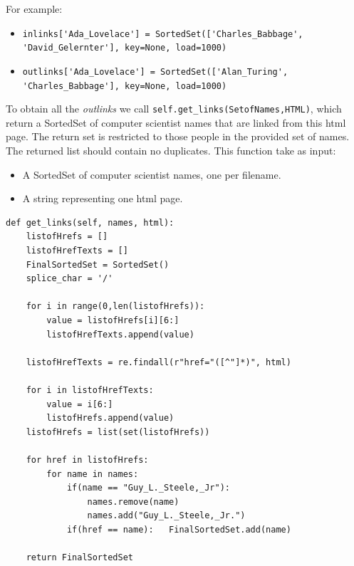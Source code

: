 \documentclass[12pt, twoside]{article}
\begin{document}
For example:
\begin{itemize}[noitemsep, topsep=0pt]
	\item \lstinline[language = iPython]{inlinks['Ada_Lovelace'] = SortedSet(['Charles_Babbage', 'David_Gelernter'], key=None, load=1000)}
	\item \lstinline[language = iPython]{outlinks['Ada_Lovelace'] = SortedSet(['Alan_Turing', 'Charles_Babbage'], key=None, load=1000)}
\end{itemize}
To obtain all the \textit{outlinks} we call \lstinline[language = iPython]{self.get_links(SetofNames,HTML)}, which return a SortedSet of computer scientist names that are linked from this html page. The return set is restricted to those people in the provided set of names. The returned list should contain no duplicates. This function take as input:
\begin{itemize}[noitemsep, topsep=0pt]
	\item	A SortedSet of computer scientist names, one per filename.
	\item	A string representing one html page.
\end{itemize}

\newpage

\begin{lstlisting}[language = iPython, caption={Get Links},captionpos=b]
def get_links(self, names, html):
	listofHrefs = []
	listofHrefTexts = []
	FinalSortedSet = SortedSet()
	splice_char = '/'

	for i in range(0,len(listofHrefs)):
		value = listofHrefs[i][6:]
		listofHrefTexts.append(value)

	listofHrefTexts = re.findall(r"href="([^"]*)", html)

	for i in listofHrefTexts:
		value = i[6:]
		listofHrefs.append(value)
	listofHrefs = list(set(listofHrefs))

	for href in listofHrefs:
		for name in names:
			if(name == "Guy_L._Steele,_Jr"):
				names.remove(name)
				names.add("Guy_L._Steele,_Jr.")
			if(href == name):	FinalSortedSet.add(name)

	return FinalSortedSet
\end{lstlisting}
\end{document}
